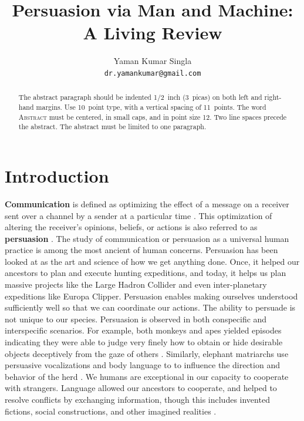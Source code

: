 \documentclass{article} %
\title{Persuasion via Man and Machine: A Living Review}
\author{Yaman Kumar Singla\\
\texttt{dr.yamankumar@gmail.com}}
\begin{document}
\maketitle

\begin{abstract}
The abstract paragraph should be indented 1/2~inch (3~picas) on both left and
right-hand margins. Use 10~point type, with a vertical spacing of 11~points.
The word \textsc{Abstract} must be centered, in small caps, and in point size 12. Two
line spaces precede the abstract. The abstract must be limited to one
paragraph.
\end{abstract}


\section{Introduction}

\textbf{Communication} is defined as optimizing the effect of a message on a receiver sent over a channel by a sender at a particular time \cite{lasswell1948structure,lasswell1971propaganda,shannon-weaver-1949}. This optimization of altering the receiver's opinions, beliefs, or actions is also referred to as \textbf{persuasion} \cite{XXX}. The study of communication or persuasion as a universal human practice is among the most ancient of human concerns. Persuasion has been looked at as the art and science of how we get anything done. Once, it helped our ancestors to plan and execute hunting expeditions, and today, it helps us plan massive projects like the Large Hadron Collider and even inter-planetary expeditions like Europa Clipper.
Persuasion enables making ourselves understood sufficiently well so that we can coordinate our actions. 
The ability to persuade is not unique to our species. Persuasion is observed in both conspecific \cite{hare2000chimpanzees} and interspecific \cite{krebs1984animal} scenarios. 
For example, both monkeys and apes yielded episodes indicating they were able to judge very finely how to obtain or hide desirable objects deceptively from the gaze of others \cite{hare2000chimpanzees}. Similarly, elephant matriarchs use persuasive vocalizations and body language to to influence the direction and behavior of the herd \cite{XXX}. We humans are exceptional in our capacity to cooperate with strangers. Language allowed our ancestors to cooperate, and helped to resolve conflicts by exchanging information, though this includes invented fictions, social constructions, and other imagined realities \cite{Harari, 2014, culture as persuasion, etc}.
\end{document}
